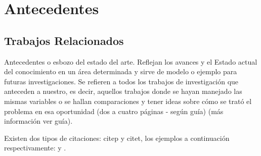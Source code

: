 \chapter{Antecedentes}


\section{Trabajos Relacionados}

Antecedentes o esbozo del estado del arte. Reflejan los avances y el Estado actual del conocimiento en un área determinada y sirve de modelo o ejemplo para futuras investigaciones. Se refieren a todos los trabajos de investigación que anteceden a nuestro, es decir, aquellos trabajos donde se hayan manejado las mismas variables o se hallan comparaciones y tener ideas sobre cómo se trató el problema en esa oportunidad (dos a cuatro páginas - según guía) (más información ver guía).


Existen dos tipos de citaciones: citep y citet, los ejemplos a continuación respectivamente: \cite{lee2007trajectory} y \cite{roh2010nncluster}.
